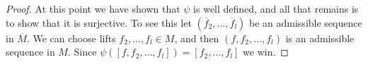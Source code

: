 \documentclass[10pt,a4paper]{amsart}
\theoremstyle{plain}
\theoremstyle{definition}
\theoremstyle{remark}
\numberwithin{equation}{subsection}
\begin{document}
\begin{proof}
\medskip\noindent
At this point we have shown that $\psi$ is well defined, and all that remains
is to show that it is surjective. To see this let
$(\overline{f}_2, \ldots, \overline{f}_l)$ be an admissible sequence
in $\overline{M}$. We can choose lifts $f_2, \ldots, f_l \in M$, and
then $(f, f_2, \ldots, f_l)$ is an admissible sequence in $M$.
Since $\psi([f, f_2, \ldots, f_l]) = [f_2, \ldots, f_l]$ we win.
\end{proof}
\end{document}
